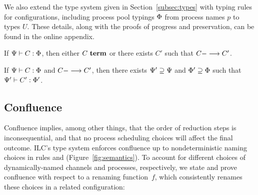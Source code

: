 We also extend the type system given in Section~\ref{subsec:types} with typing
rules for configurations, including process pool typings $\PrTy$ from process
names $p$ to types $U$. These details, along with the proofs of progress and
preservation, can be found in the online appendix.
%
%



\begin{theorem}[Progress]
If $\JCty{\StTy}{\ChTy}{C}{\PrTy}$, then either $\JCterm{C}$ or there exists
$C'$ such that $\JCred{C}{C'}$.
\end{theorem}

\begin{theorem}[Preservation]
If $\JCty{\StTy}{\ChTy}{C}{\PrTy}$ and $\JCred{C}{C'}$, then there exists
$\ChTy' \supseteq \ChTy$ and $\PrTy' \supseteq \PrTy$ such that
$\JCty{\StTy'}{\ChTy'}{C'}{\PrTy'}$.
\end{theorem}

\subsection{Confluence}

Confluence implies, among other things, that the order of reduction steps is
inconsequential, and that no process scheduling choices will affect
the final outcome. ILC's type system enforces confluence 
up to nondeterministic naming choices in 
rules  and  (Figure~\ref{fig:semantics}).
%
To account for different choices of dynamically-named channels and processes, respectively, 
we state and prove confluence
with respect to a renaming function~$f$, which consistently renames
these choices in a related configuration:

